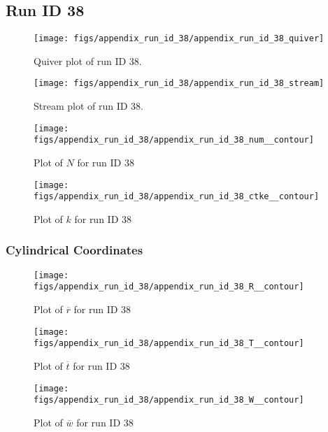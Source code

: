 \subsection{Run ID 38}
\begin{figure}[H]
\centering
\texttt{[image: figs/appendix\_run\_id\_38/appendix\_run\_id\_38\_quiver]}
\caption{Quiver plot of run ID 38.}
\label{fig:appendix_run_id_38_quiver}
\end{figure}


\begin{figure}[H]
\centering
\texttt{[image: figs/appendix\_run\_id\_38/appendix\_run\_id\_38\_stream]}
\caption{Stream plot of run ID 38.}
\label{fig:appendix_run_id_38_stream}
\end{figure}


\begin{figure}[H]
\centering
\texttt{[image: figs/appendix\_run\_id\_38/appendix\_run\_id\_38\_num\_\_contour]}
\caption{Plot of $N$ for run ID 38}
\label{fig:appendix_run_id_38_num__contour}
\end{figure}


\begin{figure}[H]
\centering
\texttt{[image: figs/appendix\_run\_id\_38/appendix\_run\_id\_38\_ctke\_\_contour]}
\caption{Plot of $k$ for run ID 38}
\label{fig:appendix_run_id_38_ctke__contour}
\end{figure}


\subsubsection{Cylindrical Coordinates}
\begin{figure}[H]
\centering
\texttt{[image: figs/appendix\_run\_id\_38/appendix\_run\_id\_38\_R\_\_contour]}
\caption{Plot of $\overline{r}$ for run ID 38}
\label{fig:appendix_run_id_38_R__contour}
\end{figure}


\begin{figure}[H]
\centering
\texttt{[image: figs/appendix\_run\_id\_38/appendix\_run\_id\_38\_T\_\_contour]}
\caption{Plot of $\overline{t}$ for run ID 38}
\label{fig:appendix_run_id_38_T__contour}
\end{figure}


\begin{figure}[H]
\centering
\texttt{[image: figs/appendix\_run\_id\_38/appendix\_run\_id\_38\_W\_\_contour]}
\caption{Plot of $\overline{w}$ for run ID 38}
\label{fig:appendix_run_id_38_W__contour}
\end{figure}


